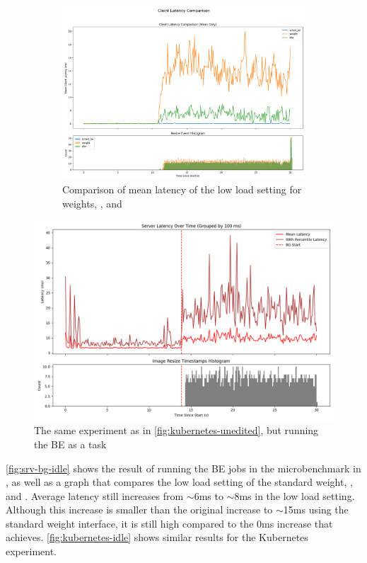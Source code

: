 \begin{figure}[t]
\begin{subfigure}[t]{\columnwidth}
        \includegraphics[width=\columnwidth]{graphs/srv-bg-cmp-all.png}
        \caption{Comparison of mean latency of the low load setting for weights,
        \schedidle{}, and \schedbe{}}\label{fig:srv-bg-cmp}
    \end{subfigure}
    \vspace{4pt}
    \caption{}\label{fig:srv-bg-idle}
\end{figure}

\begin{figure}[t]
    \centering
    \includegraphics[width=\columnwidth]{graphs/kubernetes-idle.png}
    \caption{The same experiment as in \autoref{fig:kubernetes-unedited}, but
    running the BE as a \schedidle{} task}\label{fig:kubernetes-idle}
\end{figure}

\autoref{fig:srv-bg-idle} shows the result of running the BE jobs in the
microbenchmark in \schedidle{}, as well as a graph that compares the low load
setting of the standard \cgroups{} weight, \schedbe{}, and \schedidle{}. Average
latency still increases from $\sim$6ms to $\sim$8ms in the low load setting.
Although this increase is smaller than the original increase to $\sim$15ms using
the standard weight interface, it is still high compared to the 0ms increase
that \schedbe{} achieves. \autoref{fig:kubernetes-idle} shows similar results
for the Kubernetes experiment.